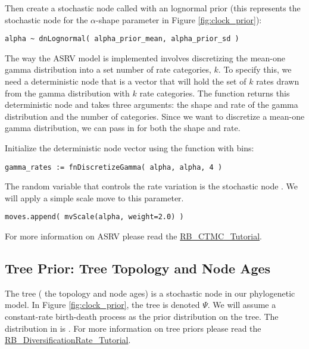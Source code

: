Then create a stochastic node called  with an lognormal prior (this represents the stochastic node for the $\alpha$-shape parameter in Figure \ref{fig:clock_prior}):
{\tt\begin{snugshade*}
\begin{lstlisting}
alpha ~ dnLognormal( alpha_prior_mean, alpha_prior_sd )
\end{lstlisting}
\end{snugshade*}}

The way the ASRV model is implemented involves discretizing the mean-one gamma distribution into a set number of rate categories, $k$. 
To specify this, we need a deterministic node that is a vector that will hold the set of $k$ rates drawn from the gamma distribution with $k$ rate categories. 
The  function returns this deterministic node and takes three arguments: the shape and rate of the gamma distribution and the number of categories. 
Since we want to discretize a mean-one gamma distribution, we can pass in  for both the shape and rate.

Initialize the  deterministic node vector using the   function with  bins:
{\tt \begin{snugshade*}
\begin{lstlisting}
gamma_rates := fnDiscretizeGamma( alpha, alpha, 4 )
\end{lstlisting}
\end{snugshade*}}

The random variable that controls the rate variation is the stochastic node . 
We will apply a simple scale move to this parameter.
{\tt \begin{snugshade*}
\begin{lstlisting}
moves.append( mvScale(alpha, weight=2.0) )
\end{lstlisting}
\end{snugshade*}}

For more information on ASRV please read the \href{https://github.com/revbayes/revbayes_tutorial/raw/master/tutorial_TeX/RB_CTMC_Tutorial/RB_CTMC_Tutorial.pdf}{RB\_CTMC\_Tutorial}.



\subsection{Tree Prior: Tree Topology and Node Ages}

The tree ( the topology and node ages) is a stochastic node in our phylogenetic model. 
In Figure \ref{fig:clock_prior}, the tree is denoted $\Psi$.
We will assume a constant-rate birth-death process as the prior distribution on the tree.
The distribution in \RevBayes is . 
For more information on tree priors please read the \href{https://github.com/revbayes/revbayes_tutorial/raw/master/tutorial_TeX/RB_DiversificationRate_Tutorial/RB_Diversification_Tutorial.pdf}{RB\_DiversificationRate\_Tutorial}.

